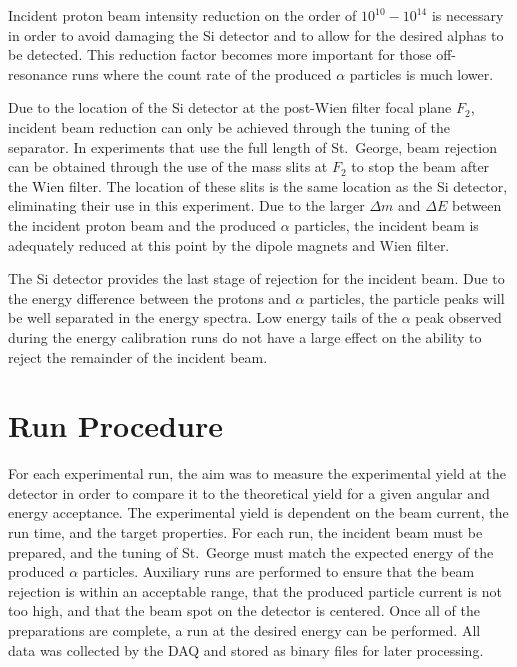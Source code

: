 
Incident proton beam intensity reduction on the order of
$10^{10} - 10^{14}$ is necessary in order to avoid damaging the Si
detector and to allow for the desired alphas to be detected. This
reduction factor becomes more important for those off-resonance runs
where the count rate of the produced $\alpha$ particles is much lower.

Due to the location of the Si detector at the post-Wien filter focal
plane $F_2$, incident beam reduction can only be achieved through the
tuning of the separator. In experiments that use the full length of
St.\ George, beam rejection can be obtained through the use of the mass
slits at $F_2$ to stop the beam after the Wien filter. The location of
these slits is the same location as the Si detector, eliminating their
use in this experiment. Due to the larger $\Delta m$ and $\Delta E$
between the incident proton beam and the produced $\alpha$ particles,
the incident beam is adequately reduced at this point by the dipole
magnets and Wien filter.

The Si detector provides the last stage of rejection for the incident
beam. Due to the energy difference between the protons and $\alpha$
particles, the particle peaks will be well separated in the energy
spectra. Low energy tails of the $\alpha$ peak observed during the
energy calibration runs do not have a large effect on the ability to
reject the remainder of the incident beam.


\section{Run Procedure}

For each experimental run, the aim was to measure the experimental yield
at the detector in order to compare it to the theoretical yield for a
given angular and energy acceptance. The experimental yield is dependent
on the beam current, the run time, and the target properties. For each
run, the incident beam must be prepared, and the tuning of St.\ George
must match the expected energy of the produced $\alpha$ particles.
Auxiliary runs are performed to ensure that the beam rejection is within
an acceptable range, that the produced particle current is not too high,
and that the beam spot on the detector is centered. Once all of the
preparations are complete, a run at the desired energy can be performed.
All data was collected by the DAQ and stored as binary files for later
processing.

